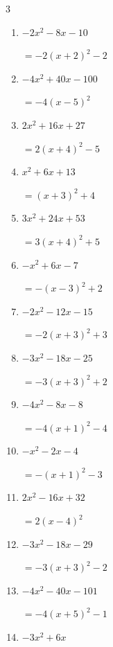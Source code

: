 \begin{multicols}{3}
\begin{enumerate}
        $=-3\left( x-2\right)^{2}-4$

  \item $-2x^{2}-8x-10$

        $=-2\left( x+2\right)^{2}-2$

  \item $-4x^{2}+40x-100$

        $=-4\left( x-5\right)^{2}$

  \item $2x^{2}+16x+27$

        $=2\left( x+4\right)^{2}-5$

  \item $x^{2}+6x+13$

        $=\left( x+3\right)^{2}+4$

\columnbreak %

\resetques

  \item $3x^{2}+24x+53$

        $=3\left( x+4\right)^{2}+5$

  \item $-x^{2}+6x-7$

        $=-\left( x-3\right)^{2}+2$

  \item $-2x^{2}-12x-15$

        $=-2\left( x+3\right)^{2}+3$

  \item $-3x^{2}-18x-25$

        $=-3\left( x+3\right)^{2}+2$

  \item $-4x^{2}-8x-8$

        $=-4\left( x+1\right)^{2}-4$

  \item $-x^{2}-2x-4$

        $=-\left( x+1\right)^{2}-3$

  \item $2x^{2}-16x+32$

        $=2\left( x-4\right)^{2}$

  \item $-3x^{2}-18x-29$

        $=-3\left( x+3\right)^{2}-2$

  \item $-4x^{2}-40x-101$

        $=-4\left( x+5\right)^{2}-1$

  \item $-3x^{2}+6x$


\end{enumerate}
\end{multicols}
